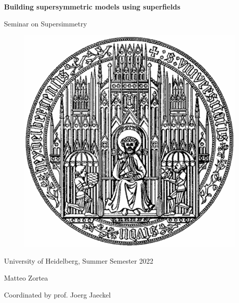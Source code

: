 \documentclass[12pt]{article}
\begin{document}
\centerline{\Large\bfseries Building supersymmetric models using superfields}
\vspace{5pt}
\centerline{\large Seminar on Supersimmetry}

\vspace{50pt}

\begin{figure}[h]
  \centering 
  \includegraphics[scale=0.45]{images/uniheilogo.png}
\end{figure}

\vspace{50pt}

\centerline{University of Heidelberg, Summer Semester 2022}
\vspace{5pt}
\centerline{Matteo Zortea}
\vspace{5pt}
\centerline{Coordinated by prof. Joerg Jaeckel}
\end{document}
